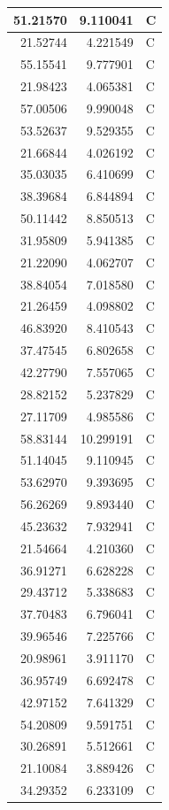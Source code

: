\documentclass[
  letterpaper,
  DIV=11,
  numbers=noendperiod]{scrartcl}
\begin{document}
\begin{table}
\begin{tabular}[t]{r|r|l}
\hline
51.21570 & 9.110041 & C\\
\hline
21.52744 & 4.221549 & C\\
\hline
55.15541 & 9.777901 & C\\
\hline
21.98423 & 4.065381 & C\\
\hline
57.00506 & 9.990048 & C\\
\hline
53.52637 & 9.529355 & C\\
\hline
21.66844 & 4.026192 & C\\
\hline
35.03035 & 6.410699 & C\\
\hline
38.39684 & 6.844894 & C\\
\hline
50.11442 & 8.850513 & C\\
\hline
31.95809 & 5.941385 & C\\
\hline
21.22090 & 4.062707 & C\\
\hline
38.84054 & 7.018580 & C\\
\hline
21.26459 & 4.098802 & C\\
\hline
46.83920 & 8.410543 & C\\
\hline
37.47545 & 6.802658 & C\\
\hline
42.27790 & 7.557065 & C\\
\hline
28.82152 & 5.237829 & C\\
\hline
27.11709 & 4.985586 & C\\
\hline
58.83144 & 10.299191 & C\\
\hline
51.14045 & 9.110945 & C\\
\hline
53.62970 & 9.393695 & C\\
\hline
56.26269 & 9.893440 & C\\
\hline
45.23632 & 7.932941 & C\\
\hline
21.54664 & 4.210360 & C\\
\hline
36.91271 & 6.628228 & C\\
\hline
29.43712 & 5.338683 & C\\
\hline
37.70483 & 6.796041 & C\\
\hline
39.96546 & 7.225766 & C\\
\hline
20.98961 & 3.911170 & C\\
\hline
36.95749 & 6.692478 & C\\
\hline
42.97152 & 7.641329 & C\\
\hline
54.20809 & 9.591751 & C\\
\hline
30.26891 & 5.512661 & C\\
\hline
21.10084 & 3.889426 & C\\
\hline
34.29352 & 6.233109 & C\\

\end{tabular}
\end{table}
\end{document}
